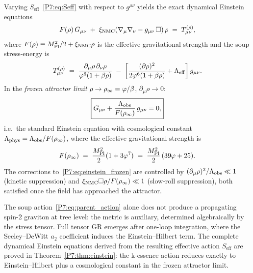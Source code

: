 \begin{theorem}
\label{P7:thm:einstein}
Varying $S_{\mathrm{eff}}$~\eqref{P7:eq:Seff} with respect to
$g^{\mu\nu}$ yields the exact dynamical Einstein equations
\begin{equation}
  F(\rho)\,G_{\mu\nu}
  \;+\; \xi_{\mathrm{NMC}}\!\left(\nabla_\mu\nabla_\nu - g_{\mu\nu}\,\square\right)\rho
  \;=\; T_{\mu\nu}^{(\rho)},
  \label{P7:eq:einstein_full}
\end{equation}
where $F(\rho)\equiv M_{\mathrm{Pl}}^2/2 + \xi_{\mathrm{NMC}}\rho$ is the effective gravitational
strength and the soup stress-energy is
\begin{equation}
  T_{\mu\nu}^{(\rho)}
  \;=\; \frac{\partial_\mu\rho\,\partial_\nu\rho}{\varphi^6(1+\beta\rho)}
  \;-\; \left[\frac{(\partial\rho)^2}{2\varphi^6(1+\beta\rho)}
             + \Lambda_{\mathrm{eff}}\right]g_{\mu\nu}.
  \label{P7:eq:Tmunu}
\end{equation}
In the \emph{frozen attractor limit} $\rho\to\rho_{\infty}=\varphi/\beta$, $\partial_\mu\rho\to0$:
\begin{equation}
  \boxed{G_{\mu\nu} + \frac{\Lambda_{\mathrm{obs}}}{F(\rho_{\infty})}\,g_{\mu\nu} = 0,}
  \label{P7:eq:einstein_frozen}
\end{equation}
i.e.\ the standard Einstein equation with cosmological constant
$\Lambda_{\mathrm{phys}}=\Lambda_{\mathrm{obs}}/F(\rho_{\infty})$, where the effective
gravitational strength is
\begin{equation}
  F(\rho_{\infty})
  \;=\; \frac{M_{\mathrm{Pl}}^2}{2}(1 + 3\varphi^7)
  \;=\; \frac{M_{\mathrm{Pl}}^2}{2}\,(39\varphi + 25).
  \label{P7:eq:Feff}
\end{equation}
The corrections to~\eqref{P7:eq:einstein_frozen} are controlled by
$(\partial_\mu\rho)^2/\Lambda_{\mathrm{obs}} \ll 1$ (kinetic suppression) and
$\xi_{\mathrm{NMC}}\square\rho/F(\rho_{\infty})\ll1$ (slow-roll suppression),
both satisfied once the field has approached the attractor.
\end{theorem}

\begin{remark}
\label{P7:rem:spin2}
The soup action~\eqref{P7:eq:parent_action} alone does not produce a
propagating spin-2 graviton at tree level: the metric is auxiliary,
determined algebraically by the stress tensor.  Full tensor GR emerges
after one-loop integration, where the
Seeley--DeWitt $a_2$ coefficient induces the Einstein--Hilbert term.
The complete dynamical Einstein equations derived from the resulting
effective action $S_{\mathrm{eff}}$ are proved in Theorem~\ref{P7:thm:einstein}:
the k-essence action reduces exactly to
Einstein--Hilbert plus a cosmological constant in the frozen attractor limit.
\end{remark}

